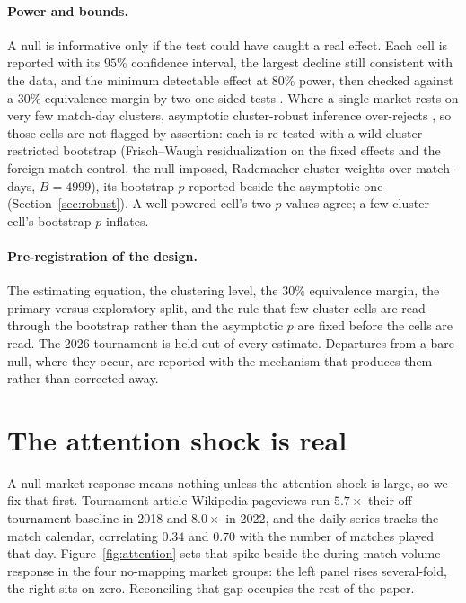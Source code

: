 \documentclass[12pt]{article}
\begin{document}
\paragraph{Power and bounds.} A null is informative only if the test could have caught a real effect. Each cell is reported with its $95\%$ confidence interval, the largest decline still consistent with the data, and the minimum detectable effect at $80\%$ power, then checked against a $30\%$ equivalence margin by two one-sided tests \cite{lakens2017}. Where a single market rests on very few match-day clusters, asymptotic cluster-robust inference over-rejects \cite{cameron2008}, so those cells are not flagged by assertion: each is re-tested with a wild-cluster restricted bootstrap (Frisch--Waugh residualization on the fixed effects and the foreign-match control, the null imposed, Rademacher cluster weights over match-days, $B=4999$), its bootstrap $p$ reported beside the asymptotic one (Section~\ref{sec:robust}). A well-powered cell's two $p$-values agree; a few-cluster cell's bootstrap $p$ inflates.

\paragraph{Pre-registration of the design.} The estimating equation, the clustering level, the $30\%$ equivalence margin, the primary-versus-exploratory split, and the rule that few-cluster cells are read through the bootstrap rather than the asymptotic $p$ are fixed before the cells are read. The 2026 tournament is held out of every estimate. Departures from a bare null, where they occur, are reported with the mechanism that produces them rather than corrected away.

\section{The attention shock is real}\label{sec:attention}
A null market response means nothing unless the attention shock is large, so we fix that first. Tournament-article Wikipedia pageviews run $5.7\times$ their off-tournament baseline in 2018 and $8.0\times$ in 2022, and the daily series tracks the match calendar, correlating $0.34$ and $0.70$ with the number of matches played that day. Figure~\ref{fig:attention} sets that spike beside the during-match volume response in the four no-mapping market groups: the left panel rises several-fold, the right sits on zero. Reconciling that gap occupies the rest of the paper.
\end{document}
